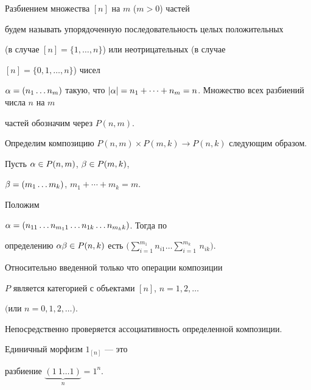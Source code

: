 Разбиением множества $[n]$ на $m$ ($m>0$) частей


будем называть упорядоченную последовательность целых положительных


(в случае $[n]=\{1,\dotsc,n\}$) или неотрицательных (в случае


$[n]=\{0,1,\dotsc,n\}$) чисел


$\al=(n_1\dotsc n_m)$ такую, что $| \al|=


n_1+ \dotsb + n_m =n$. Множество всех разбиений числа $n$ на $m$


частей обозначим через $P(n,m)$.








Определим композицию $P(n,m)\times P(m,k)\to P(n,k)$ следующим образом.


Пусть $\alpha\in P(n, m)$, $\beta\in P(m,k)$,


$\beta=(m_1\dotsc m_k)$, $ m_1+\dotsb +m_k=m$.


Положим


$\alpha=(n_{11}\dotsc n_{m_11}\dotsc n_{1k}\dotsc n_{m_kk})$. Тогда по


определению $\al\be \in P(n,k)$ есть $\Big(\sum\limits_{i=1}^{m_1}


n_{i1}\dotsc \sum\limits_{i=1}^{m_k}\,n_{ik}\Big)$.








\begin{lem}


Относительно введенной только что операции композиции


$P$ является категорией с объектами $[n]$, $n=1,2,\dotsc$


$($или $n=0,1,2,\dotsc)$.


\end{lem}





\begin{pf}


Непосредственно проверяется ассоциативность определенной композиции.


Единичный морфизм $1_{[n]}$ --- это


разбиение $\underbrace{(1\ 1\dotsc 1)}_{n}=1^n$.


\end{pf}





